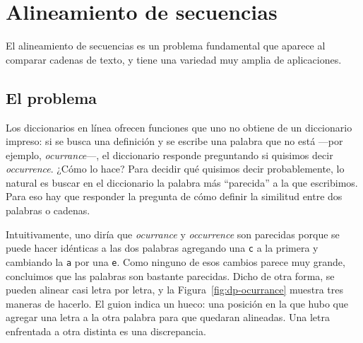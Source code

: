\documentclass[12pt, spanish, oneside, openany]{book}
\theoremstyle{uprightplain}
\theoremstyle{definition}
\theoremstyle{remark}
\theoremstyle{definition}
\begin{document}
\section{Alineamiento de secuencias}
\label{sec:dp-alineamiento}

El alineamiento de secuencias es un problema fundamental que aparece al comparar cadenas de texto, y tiene una variedad muy amplia de aplicaciones.

\subsection{El problema}

Los diccionarios en línea ofrecen funciones que uno no obtiene de un diccionario impreso: si se busca una definición y se escribe una palabra que no está ---por ejemplo, \emph{ocurrance}---, el diccionario responde preguntando si quisimos decir \emph{occurrence}. ¿Cómo lo hace? Para decidir qué quisimos decir probablemente, lo natural es buscar en el diccionario la palabra más ``parecida'' a la que escribimos. Para eso hay que responder la pregunta de cómo definir la similitud entre dos palabras o cadenas.

Intuitivamente, uno diría que \emph{ocurrance} y \emph{occurrence} son parecidas porque se puede hacer idénticas a las dos palabras agregando una \texttt{c} a la primera y cambiando la \texttt{a} por una \texttt{e}. Como ninguno de esos cambios parece muy grande, concluimos que las palabras son bastante parecidas. Dicho de otra forma, se pueden alinear casi letra por letra, y la Figura~\ref{fig:dp-ocurrance} muestra tres maneras de hacerlo. El guion indica un hueco: una posición en la que hubo que agregar una letra a la otra palabra para que quedaran alineadas. Una letra enfrentada a otra distinta es una discrepancia.
\end{document}
